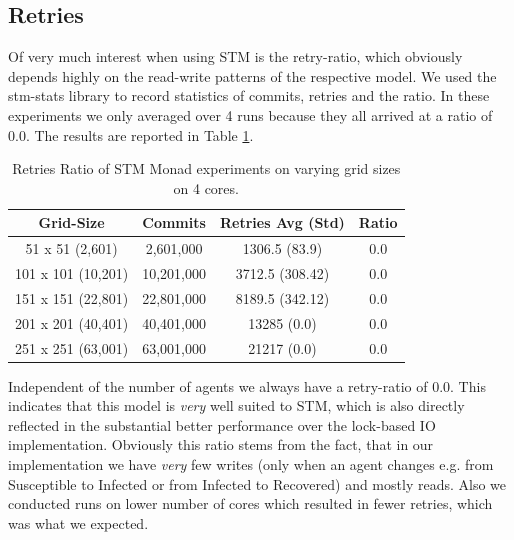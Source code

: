 
\subsection{Retries}
Of very much interest when using STM is the retry-ratio, which obviously depends highly on the read-write patterns of the respective model. We used the stm-stats library to record statistics of commits, retries and the ratio. In these experiments we only averaged over 4 runs because they all arrived at a ratio of 0.0. The results are reported in Table \ref{tab:retries_stm}.

\begin{table}
	\centering
  	\begin{tabular}{ c || c | c | c  }
        Grid-Size 		   & Commits    & Retries Avg (Std) & Ratio \\ \hline \hline 
   		51 x 51 (2,601)    & 2,601,000  & 1306.5 (83.9)     & 0.0 \\ \hline
   		101 x 101 (10,201) & 10,201,000 & 3712.5 (308.42)   & 0.0 \\ \hline
   		151 x 151 (22,801) & 22,801,000 & 8189.5 (342.12)   & 0.0 \\ \hline
   		201 x 201 (40,401) & 40,401,000 & 13285 (0.0)       & 0.0 \\ \hline 
   		251 x 251 (63,001) & 63,001,000 & 21217 (0.0)       & 0.0 \\ \hline
  	\end{tabular}
  	
  	\caption{Retries Ratio of STM Monad experiments on varying grid sizes on 4 cores.}
	\label{tab:retries_stm}
\end{table}

Independent of the number of agents we always have a retry-ratio of 0.0. This indicates that this model is \textit{very} well suited to STM, which is also directly reflected in the substantial better performance over the lock-based IO implementation. Obviously this ratio stems from the fact, that in our implementation we have \textit{very} few writes (only when an agent changes e.g. from Susceptible to Infected or from Infected to Recovered) and mostly reads. Also we conducted runs on lower number of cores which resulted in fewer retries, which was what we expected.

